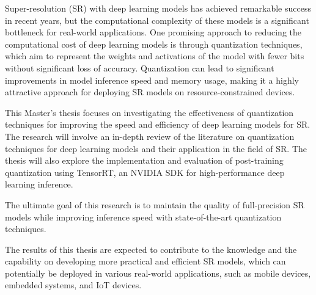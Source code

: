 \label{chap:Introduction}

Super-resolution (SR) with deep learning models has achieved remarkable success in recent years, but the computational complexity of these models is a significant bottleneck for real-world applications. One promising approach to reducing the computational cost of deep learning models is through quantization techniques, which aim to represent the weights and activations of the model with fewer bits without significant loss of accuracy. Quantization can lead to significant improvements in model inference speed and memory usage, making it a highly attractive approach for deploying SR models on resource-constrained devices.

This Master's thesis focuses on investigating the effectiveness of quantization techniques for improving the speed and efficiency of deep learning models for SR. The research will involve an in-depth review of the literature on quantization techniques for deep learning models and their application in the field of SR. The thesis will also explore the implementation and evaluation of post-training quantization using TensorRT, an NVIDIA SDK for high-performance deep learning inference. 

The ultimate goal of this research is to maintain the quality of full-precision SR models while improving inference speed with state-of-the-art quantization techniques.

The results of this thesis are expected to contribute to the knowledge and the capability on developing more practical and efficient SR models, which can potentially be deployed in various real-world applications, such as mobile devices, embedded systems, and IoT devices.


